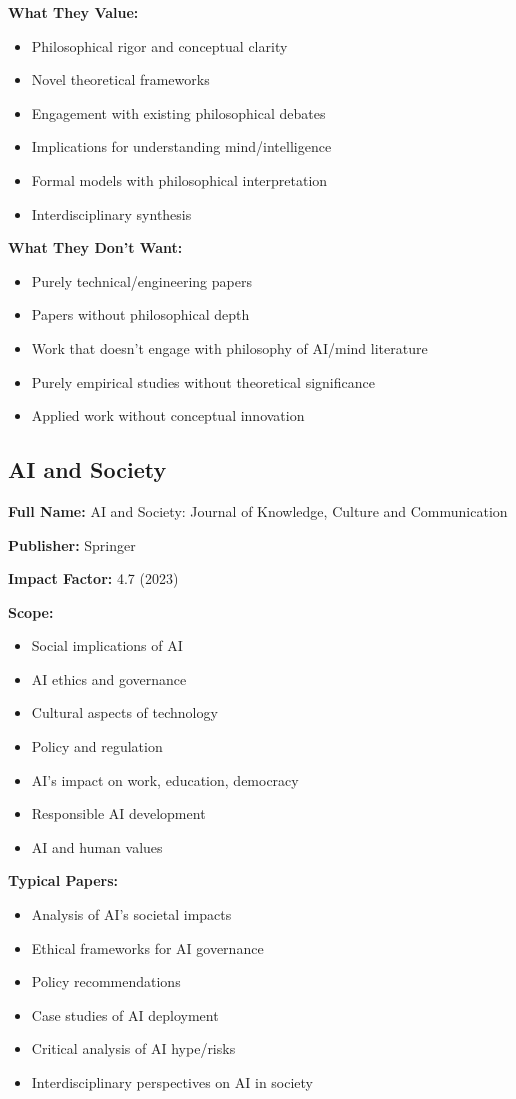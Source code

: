 \documentclass[12pt]{article}
\begin{document}
\textbf{What They Value:}
\begin{itemize}[leftmargin=*]
\item Philosophical rigor and conceptual clarity
\item Novel theoretical frameworks
\item Engagement with existing philosophical debates
\item Implications for understanding mind/intelligence
\item Formal models with philosophical interpretation
\item Interdisciplinary synthesis
\end{itemize}

\textbf{What They Don't Want:}
\begin{itemize}[leftmargin=*]
\item Purely technical/engineering papers
\item Papers without philosophical depth
\item Work that doesn't engage with philosophy of AI/mind literature
\item Purely empirical studies without theoretical significance
\item Applied work without conceptual innovation
\end{itemize}

\subsection{AI and Society}

\textbf{Full Name:} AI and Society: Journal of Knowledge, Culture and Communication

\textbf{Publisher:} Springer

\textbf{Impact Factor:} 4.7 (2023)

\textbf{Scope:}
\begin{itemize}[leftmargin=*]
\item Social implications of AI
\item AI ethics and governance
\item Cultural aspects of technology
\item Policy and regulation
\item AI's impact on work, education, democracy
\item Responsible AI development
\item AI and human values
\end{itemize}

\textbf{Typical Papers:}
\begin{itemize}[leftmargin=*]
\item Analysis of AI's societal impacts
\item Ethical frameworks for AI governance
\item Policy recommendations
\item Case studies of AI deployment
\item Critical analysis of AI hype/risks
\item Interdisciplinary perspectives on AI in society
\end{itemize}
\end{document}

